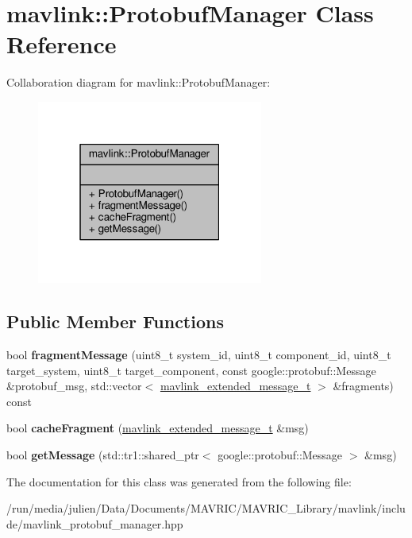 \hypertarget{classmavlink_1_1ProtobufManager}{\section{mavlink\+:\+:Protobuf\+Manager Class Reference}
\label{classmavlink_1_1ProtobufManager}
}


Collaboration diagram for mavlink\+:\+:Protobuf\+Manager\+:
\nopagebreak
\begin{figure}[H]
\begin{center}
\leavevmode
\includegraphics[width=211pt]{classmavlink_1_1ProtobufManager__coll__graph}
\end{center}
\end{figure}
\subsection*{Public Member Functions}
\begin{DoxyCompactItemize}
\item 
\hypertarget{classmavlink_1_1ProtobufManager_ac576df9f0a9868e8277ffb9a1f79e0ec}{bool {\bfseries fragment\+Message} (uint8\+\_\+t system\+\_\+id, uint8\+\_\+t component\+\_\+id, uint8\+\_\+t target\+\_\+system, uint8\+\_\+t target\+\_\+component, const google\+::protobuf\+::\+Message \&protobuf\+\_\+msg, std\+::vector$<$ \hyperlink{struct____mavlink__extended__message}{mavlink\+\_\+extended\+\_\+message\+\_\+t} $>$ \&fragments) const }\label{classmavlink_1_1ProtobufManager_ac576df9f0a9868e8277ffb9a1f79e0ec}

\item 
\hypertarget{classmavlink_1_1ProtobufManager_a7b2e4d274a1cd43aeb09a753e74387c9}{bool {\bfseries cache\+Fragment} (\hyperlink{struct____mavlink__extended__message}{mavlink\+\_\+extended\+\_\+message\+\_\+t} \&msg)}\label{classmavlink_1_1ProtobufManager_a7b2e4d274a1cd43aeb09a753e74387c9}

\item 
\hypertarget{classmavlink_1_1ProtobufManager_ad3d191e0220dffa799eeda77efc2cdc5}{bool {\bfseries get\+Message} (std\+::tr1\+::shared\+\_\+ptr$<$ google\+::protobuf\+::\+Message $>$ \&msg)}\label{classmavlink_1_1ProtobufManager_ad3d191e0220dffa799eeda77efc2cdc5}

\end{DoxyCompactItemize}


The documentation for this class was generated from the following file\+:\begin{DoxyCompactItemize}
\item 
/run/media/julien/\+Data/\+Documents/\+M\+A\+V\+R\+I\+C/\+M\+A\+V\+R\+I\+C\+\_\+\+Library/mavlink/include/mavlink\+\_\+protobuf\+\_\+manager.\+hpp\end{DoxyCompactItemize}
